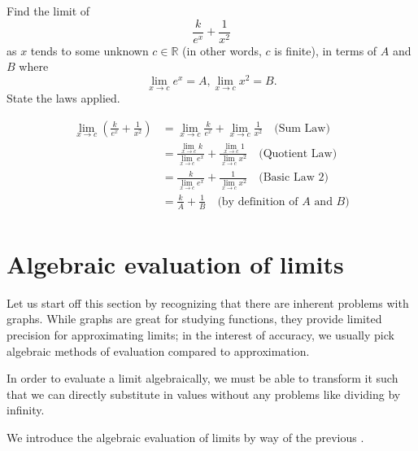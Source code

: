 \begin{example}
    Find the limit of \[\frac{k}{e^x} + \frac{1}{x^2}\] as $x$ tends to some unknown $c \in \mathbb{R}$
    (in other words, $c$ is finite),
    in terms of $A$ and $B$ where \[\lim_{x \to c} e^x = A, \lim_{x \to c} x^2 = B.\]
    State the laws applied.
\end{example}
\begin{solution}
    \begin{equation*}
        \begin{split}
            \lim_{x \to c} \left(\frac{k}{e^x} + \frac{1}{x^2}\right)
            &= \lim_{x \to c} \frac{k}{e^x} + \lim_{x \to c} \frac{1}{x^2} \quad \text{(Sum Law)} \\
            &= \frac{\lim_{x \to c} k}{\lim_{x \to c} e^x} + \frac{\lim_{x \to c} 1}{\lim_{x \to c} x^2} \quad
            \text{(Quotient Law)} \\
            &= \frac{k}{\lim_{x \to c} e^x} + \frac{1}{\lim_{x \to c} x^2} \quad
            \text{(Basic Law 2)} \\
            &= \frac{k}{A} + \frac{1}{B} \quad
            \text{(by definition of $A$ and $B$)} \\
        \end{split}
    \end{equation*}
\end{solution}

\section{Algebraic evaluation of limits}
Let us start off this section by recognizing that there are inherent problems with graphs.
While graphs are great for studying functions, they provide limited precision for approximating
limits; in the interest of accuracy, we usually pick algebraic methods of evaluation compared to approximation.

In order to evaluate a limit algebraically, we must be able to transform it such that we can directly substitute
in values without any problems like dividing by infinity.

We introduce the algebraic evaluation of limits by way of the previous .

